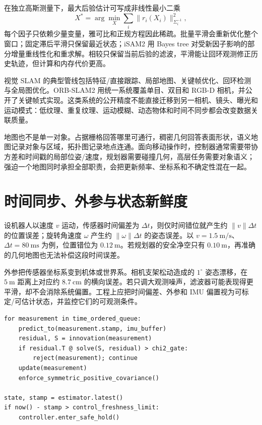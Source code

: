 在独立高斯测量下，最大后验估计可写成非线性最小二乘
\begin{equation}
X^*=\arg\min_X\sum_i\|r_i(X_i)\|_{\Sigma_i^{-1}}^2,
\label{eq:factor-graph-objective}
\end{equation}
每个因子只依赖少量变量，雅可比和正规方程因此稀疏。批量平滑会重新优化整个窗口；固定滞后平滑只保留最近状态；iSAM2 用 Bayes tree 对受新因子影响的部分增量重线性化和重求解\cite{kaess2012isam2}。相较只保留当前后验的滤波，平滑能让回环观测修正历史轨迹，但计算和内存代价更高。

视觉 SLAM 的典型管线包括特征/直接跟踪、局部地图、关键帧优化、回环检测与全局图优化。ORB-SLAM2 用统一系统覆盖单目、双目和 RGB-D 相机，并公开了关键帧式实现\cite{murartal2017orbslam2}。这类系统的公开精度不能直接迁移到另一相机、镜头、曝光和运动模式：低纹理、重复纹理、运动模糊、动态物体和时间不同步都会改变数据关联质量。

地图也不是单一对象。占据栅格回答哪里可通行，稠密几何回答表面形状，语义地图记录对象与区域，拓扑图记录地点连通。面向移动操作时，控制器通常需要带协方差和时间戳的局部位姿/速度，规划器需要碰撞几何，高层任务需要对象语义；强迫一个地图同时承担全部职责，会把更新频率、坐标系和不确定性混在一起。

\section{时间同步、外参与状态新鲜度}

设机器人以速度 $v$ 运动，传感器时间偏差为 $\Delta t$，则仅时间错位就产生约 $\|v\|\Delta t$ 的位置误差；旋转角速度 $\omega$ 产生约 $\|\omega\|\Delta t$ 的姿态误差。以 $v=1.5\ \mathrm{m/s}$、$\Delta t=80\ \mathrm{ms}$ 为例，位置错位为 $0.12\ \mathrm m$。若规划器的安全净空只有 $0.10\ \mathrm m$，再准确的几何地图也无法补偿这段时间误差。

外参把传感器坐标系变到机体或世界系。相机支架松动造成的 $1^\circ$ 姿态漂移，在 $5\ \mathrm m$ 距离上对应约 $8.7\ \mathrm{cm}$ 的横向误差。若只调大观测噪声，滤波器可能表现得更平滑，却不会消除系统偏置。工程上应把时间偏差、外参和 IMU 偏置视为可标定/可估计状态，并监控它们的可观测条件。

\begin{lstlisting}[caption={带时间戳、创新门控和新鲜度检查的融合教学伪代码}]
for measurement in time_ordered_queue:
    predict_to(measurement.stamp, imu_buffer)
    residual, S = innovation(measurement)
    if residual.T @ solve(S, residual) > chi2_gate:
        reject(measurement); continue
    update(measurement)
    enforce_symmetric_positive_covariance()

state, stamp = estimator.latest()
if now() - stamp > control_freshness_limit:
    controller.enter_safe_hold()
\end{lstlisting}

